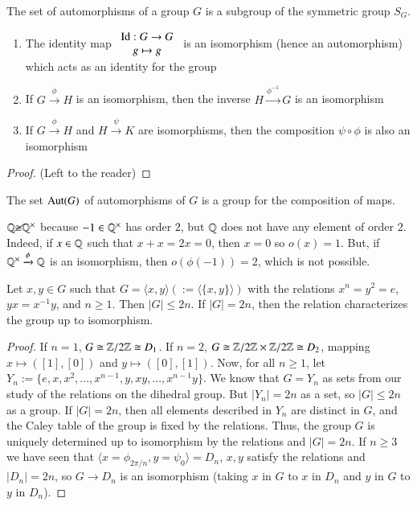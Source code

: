 \documentclass[12pt, a4paper, oneside, openright, titlepage]{book}
\begin{document}
\begin{prop}
    The set of automorphisms of a group $G$ is a subgroup of the symmetric group $S_G$.\begin{enumerate}
        \item The identity map $\begin{array}{c} \operatorname{Id}:G\rightarrow G \\ g\mapsto g \end{array}$ is an isomorphism (hence an automorphism) which acts as an identity for the group
        \item If $G\xrightarrow{\phi}H$ is an isomorphism, then the inverse $H\xrightarrow{\phi^{-1}}G$ is an isomorphism
        \item If $G\xrightarrow{\phi}H$ and $H\xrightarrow{\psi}K$ are isomorphisms, then the composition $\psi \circ \phi$ is also an isomorphism
    \end{enumerate}
\end{prop}
\begin{proof}
    (Left to the reader)
\end{proof}

\begin{cor}
    The set $\operatorname{Aut}(G)$ of automorphisms of $G$ is a group for the composition of maps.
\end{cor}

\begin{eg}
    $\mathbb Q\cancel{\cong} \mathbb Q^{\times}$ because $-1 \in \mathbb Q^{\times}$ has order $2$, but $\mathbb Q$ does not have any element of order $2$. Indeed, if $x \in \mathbb Q$ such that $x+x=2x = 0$, then $x = 0$ so $o(x) = 1$. But, if $\mathbb Q^{\times}\xrightarrow{\phi}\mathbb Q$ is an isomorphism, then $o(\phi(-1)) = 2$, which is not possible.
\end{eg}

\begin{thm}
    Let $x,y \in G$ such that $G = \langle x,y \rangle (:= \langle \{x,y\}\rangle)$ with the relations $x^n = y^2 = e$, $yx = x^{-1}y$, and $n \geq 1$. Then $|G| \leq 2n$. If $|G| = 2n$, then the relation characterizes the group up to isomorphism.
\end{thm}
\begin{proof}
    If $n = 1$, $G \cong \mathbb Z/2\mathbb Z \cong D_1$. If $n = 2$, $G \cong \mathbb Z/2\mathbb Z \times \mathbb Z/2\mathbb Z \cong D_2$, mapping $x \mapsto ([1],[0])$ and $y \mapsto ([0],[1])$. Now, for all $n \geq 1$, let $Y_n := \{e,x,x^2,...,x^{n-1},y,xy,...,x^{n-1}y\}$. We know that $G = Y_n$ as sets from our study of the relations on the dihedral group. But $|Y_n| = 2n$ as a set, so $|G| \leq 2n$ as a group. If $|G| = 2n$, then all elements described in $Y_n$ are distinct in $G$, and the Caley table of the group is fixed by the relations. Thus, the group $G$ is uniquely determined up to isomorphism by the relations and $|G| = 2n$. If $n \geq 3$ we have seen that $\langle x = \phi_{2\pi/n},y = \psi_0\rangle = D_n$, $x,y$ satisfy the relations and $|D_n| = 2n$, so $G \rightarrow D_n$ is an isomorphism (taking $x$ in $G$ to $x$ in $D_n$ and $y$ in $G$ to $y$ in $D_n$).
\end{proof}
\end{document}
